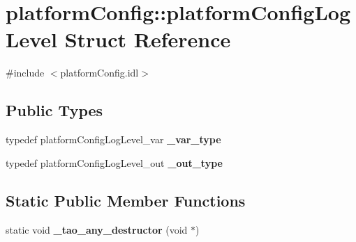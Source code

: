 \section{platform\+Config\+:\+:platform\+Config\+Log\+Level Struct Reference}
\label{structplatformConfig_1_1platformConfigLogLevel}


{\ttfamily \#include $<$platform\+Config.\+idl$>$}

\subsection*{Public Types}
\begin{DoxyCompactItemize}
\item 
typedef platform\+Config\+Log\+Level\+\_\+var {\bfseries \+\_\+var\+\_\+type}\label{structplatformConfig_1_1platformConfigLogLevel_a1d99169752b6380c5831d599c8916d4b}

\item 
typedef platform\+Config\+Log\+Level\+\_\+out {\bfseries \+\_\+out\+\_\+type}\label{structplatformConfig_1_1platformConfigLogLevel_a528084a4e7ca005f58d5078d90905402}

\end{DoxyCompactItemize}
\subsection*{Static Public Member Functions}
\begin{DoxyCompactItemize}
\item 
static void {\bfseries \+\_\+tao\+\_\+any\+\_\+destructor} (void $\ast$)\label{structplatformConfig_1_1platformConfigLogLevel_a71be6f58d1ba944640b5834f92e71013}

\end{DoxyCompactItemize}
